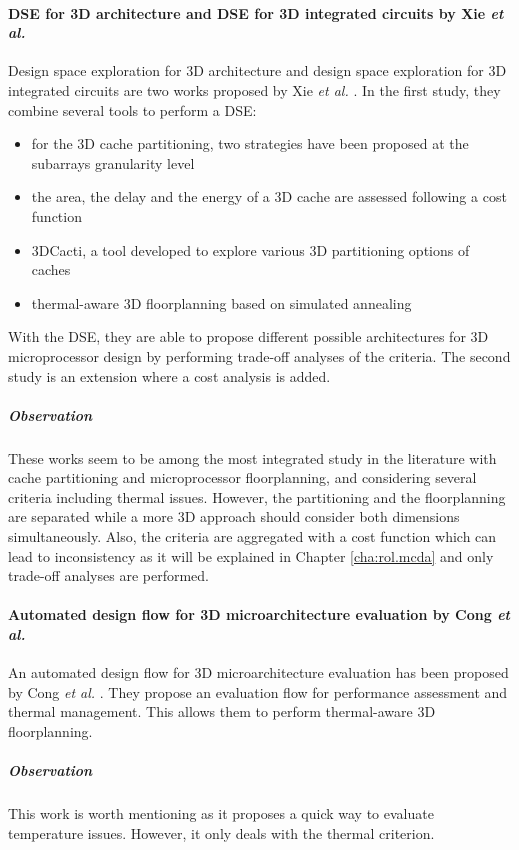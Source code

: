 \paragraph{DSE for 3D architecture and DSE for 3D integrated circuits by Xie \textit{et al.}}
Design space exploration for 3D architecture and design space exploration for 3D integrated circuits are two works proposed by Xie \textit{et al.} \cite{Xie:2006:DSE:1148015.1148016,4735042}. In the first study, they combine several tools to perform a DSE:
\begin{itemize}
\item for the 3D cache partitioning, two strategies have been proposed at the subarrays granularity level
\item the area, the delay and the energy of a 3D cache are assessed following a cost function
\item 3DCacti, a tool developed to explore various 3D partitioning options of caches
\item thermal-aware 3D floorplanning based on simulated annealing
\end{itemize}
With the DSE, they are able to propose different possible architectures for 3D microprocessor design by performing trade-off analyses of the criteria.
The second study is an extension where a cost analysis is added.
 
\subparagraph{Observation}
These works seem to be among the most integrated study in the literature with cache partitioning and microprocessor floorplanning, and considering several criteria including thermal issues. However, the partitioning and the floorplanning are separated while a more 3D approach should consider both dimensions simultaneously. Also, the criteria are aggregated with a cost function which can lead to inconsistency as it will be explained in Chapter \ref{cha:rol.mcda} and only trade-off analyses are performed.

\paragraph{Automated design flow for 3D microarchitecture evaluation by Cong \textit{et al.}}
An automated design flow for 3D microarchitecture evaluation has been proposed by Cong \textit{et al.} \cite{1594713}. They propose an evaluation flow for performance assessment and thermal management. This allows them to perform thermal-aware 3D floorplanning.

\subparagraph{Observation}
This work is worth mentioning as it proposes a quick way to evaluate temperature issues. However, it only deals with the thermal criterion.

